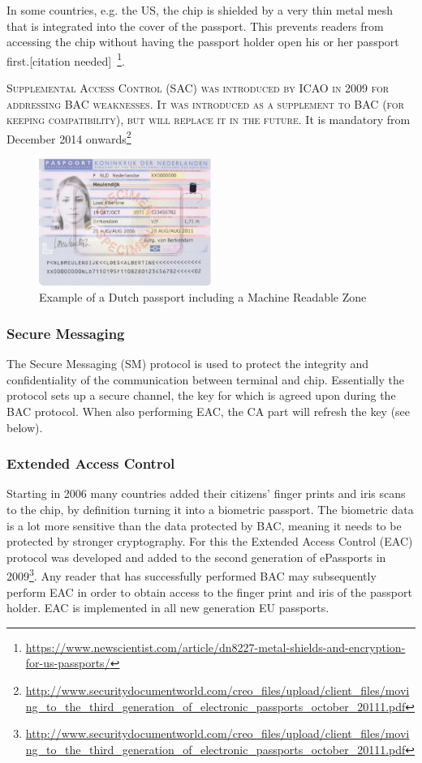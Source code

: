 In some countries, e.g. the US, the chip is shielded by a very thin metal mesh that is integrated into the cover of the passport. This prevents readers from accessing the chip without having the passport holder open his or her passport first.[citation needed]~\footnote{\url{https://www.newscientist.com/article/dn8227-metal-shields-and-encryption-for-us-passports/}}.

\textsc{Supplemental Access Control (SAC) was introduced by ICAO in 2009 for addressing BAC weaknesses. It was introduced as a supplement to BAC (for keeping compatibility), but will replace it in the future.} It is mandatory from December 2014 onwards\footnote{\url{http://www.securitydocumentworld.com/creo_files/upload/client_files/moving_to_the_third_generation_of_electronic_passports_october_20111.pdf}}

\begin{figure}[htb]
	\centering
		\includegraphics[width=0.50\textwidth]{images/dutchpassport.png}
	\caption{Example of a Dutch passport including a Machine Readable Zone}
	\label{fig:dutchpassport}
\end{figure}

\subsubsection{Secure Messaging}
The Secure Messaging (SM) protocol is used to protect the integrity and confidentiality of the communication between terminal and chip. Essentially the protocol sets up a secure channel, the key for which is agreed upon during the BAC protocol. When also performing EAC, the CA part will refresh the key (see below).

\subsubsection{Extended Access Control}
Starting in 2006 many countries added their citizens' finger prints and iris scans to the chip, by definition turning it into a biometric passport. The biometric data is a lot more sensitive than the data protected by BAC, meaning it needs to be protected by stronger cryptography. For this the Extended Access Control (EAC) protocol was developed and added to the second generation of ePassports in 2009\footnote{\url{http://www.securitydocumentworld.com/creo_files/upload/client_files/moving_to_the_third_generation_of_electronic_passports_october_20111.pdf}}. Any reader that has successfully performed BAC may subsequently perform EAC in order to obtain access to the finger print and iris of the passport holder. EAC is implemented in all new generation EU passports.

